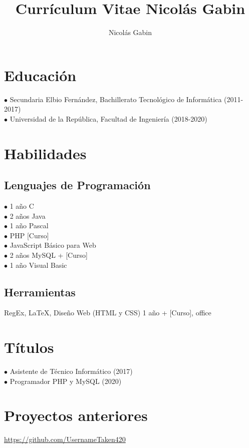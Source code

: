 \documentclass{article}
\begin{document}
\title{Curr\'iculum Vitae Nicol\'as Gabin}
\author{Nicol\'as Gabin}
\date{}

\maketitle

\section{Educaci\'on}
{$\bullet$} Secundaria Elbio Fern\'andez, Bachillerato Tecnol\'ogico de Inform\'atica (2011-2017)\\
{$\bullet$} Universidad de la Rep\'ublica, Facultad de Ingenier\'ia (2018-2020)

\section{Habilidades}

\subsection{Lenguajes de Programaci\'on}
{$\bullet$} 1 año C\\
{$\bullet$} 2 años Java\\
{$\bullet$} 1 año Pascal\\
{$\bullet$} PHP [Curso]\\
{$\bullet$} JavaScript B\'asico para Web\\
{$\bullet$} 2 años MySQL + [Curso]\\
{$\bullet$} 1 año Visual Basic\\

\subsection{Herramientas}
RegEx, {\LaTeX}, Diseño Web (HTML y CSS) 1 año + [Curso], office

\section{T\'itulos}
{$\bullet$} Asistente de T\'ecnico Inform\'atico (2017)\\
{$\bullet$} Programador PHP y MySQL (2020)

\section{Proyectos anteriores}
\url{https://github.com/UsernameTaken420}
\end{document}

